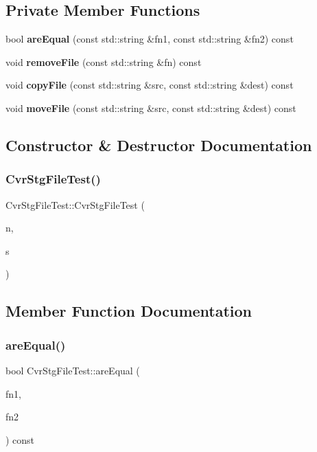 \subsection*{Private Member Functions}
\begin{DoxyCompactItemize}
\item 
bool \textbf{ are\+Equal} (const std\+::string \&fn1, const std\+::string \&fn2) const
\item 
void \textbf{ remove\+File} (const std\+::string \&fn) const
\item 
void \textbf{ copy\+File} (const std\+::string \&src, const std\+::string \&dest) const
\item 
void \textbf{ move\+File} (const std\+::string \&src, const std\+::string \&dest) const
\end{DoxyCompactItemize}


\subsection{Constructor \& Destructor Documentation}
\mbox{\label{classCvrStgFileTest_a490e6158822a3b73b8935becef5a683f}} 
\subsubsection{Cvr\+Stg\+File\+Test()}
{\footnotesize\ttfamily Cvr\+Stg\+File\+Test\+::\+Cvr\+Stg\+File\+Test (\begin{DoxyParamCaption}\item[{std\+::string}]{n,  }\item[{\textbf{ Test\+Suite} $\ast$}]{s }\end{DoxyParamCaption})\hspace{0.3cm}{\ttfamily [inline]}}



\subsection{Member Function Documentation}
\mbox{\label{classCvrStgFileTest_ade841ab9117d084ca19bbeb2562912ab}} 
\subsubsection{are\+Equal()}
{\footnotesize\ttfamily bool Cvr\+Stg\+File\+Test\+::are\+Equal (\begin{DoxyParamCaption}\item[{const std\+::string \&}]{fn1,  }\item[{const std\+::string \&}]{fn2 }\end{DoxyParamCaption}) const\hspace{0.3cm}{\ttfamily [private]}}

